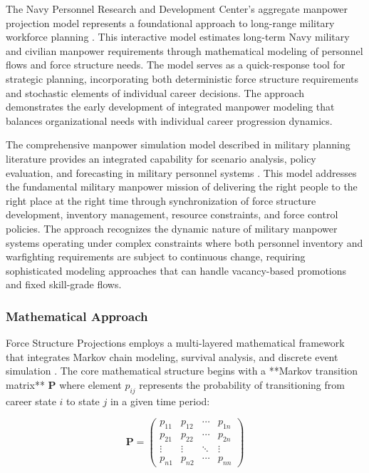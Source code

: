 \documentclass[main.tex]{subfiles}
\begin{document}
The Navy Personnel Research and Development Center's aggregate manpower projection model represents a foundational approach to long-range military workforce planning \parencite{navy_manpower}. This interactive model estimates long-term Navy military and civilian manpower requirements through mathematical modeling of personnel flows and force structure needs. The model serves as a quick-response tool for strategic planning, incorporating both deterministic force structure requirements and stochastic elements of individual career decisions. The approach demonstrates the early development of integrated manpower modeling that balances organizational needs with individual career progression dynamics.

The comprehensive manpower simulation model described in military planning literature provides an integrated capability for scenario analysis, policy evaluation, and forecasting in military personnel systems \parencite{manpower_simulation}. This model addresses the fundamental military manpower mission of delivering the right people to the right place at the right time through synchronization of force structure development, inventory management, resource constraints, and force control policies. The approach recognizes the dynamic nature of military manpower systems operating under complex constraints where both personnel inventory and warfighting requirements are subject to continuous change, requiring sophisticated modeling approaches that can handle vacancy-based promotions and fixed skill-grade flows.

\subsubsection{Mathematical Approach}

Force Structure Projections employs a multi-layered mathematical framework that integrates Markov chain modeling, survival analysis, and discrete event simulation \parencite{eisler_allen,markov_career_progression}. The core mathematical structure begins with a **Markov transition matrix** $\mathbf{P}$ where element $p_{ij}$ represents the probability of transitioning from career state $i$ to state $j$ in a given time period:

$$\mathbf{P} = \begin{pmatrix}
p_{11} & p_{12} & \cdots & p_{1n} \\
p_{21} & p_{22} & \cdots & p_{2n} \\
\vdots & \vdots & \ddots & \vdots \\
p_{n1} & p_{n2} & \cdots & p_{nn}
\end{pmatrix}$$
\end{document}
